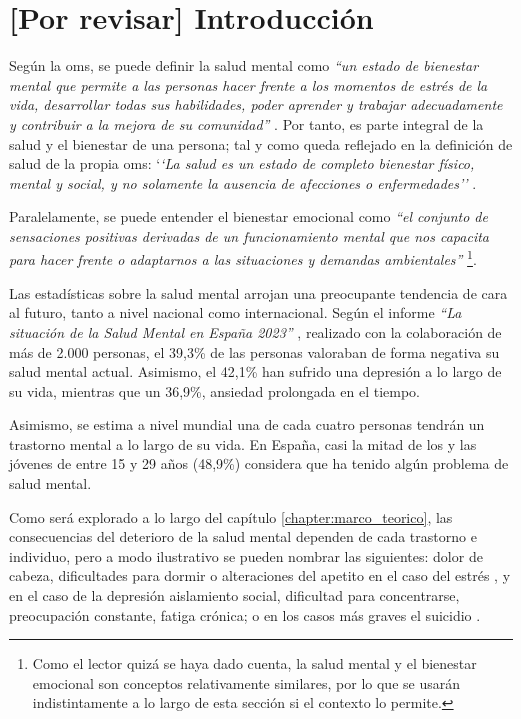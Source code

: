 \chapter{[Por revisar] Introducción}
\label{chapter:introduccion}


Según la \gls{oms}, se puede definir la salud mental como \textit{``un estado de bienestar mental que permite a las personas hacer frente a los momentos de estrés de la vida, desarrollar todas sus habilidades, poder aprender y trabajar adecuadamente y contribuir a la mejora de su comunidad''} \cite{oms_salud_2022}. Por tanto, es parte integral de la salud y el bienestar de una persona; tal y como queda reflejado en la definición de salud de la propia \gls{oms}: `\textit{`La salud es un estado de completo bienestar físico, mental y social, y no solamente la ausencia de afecciones o enfermedades''} \cite{feafes_galicia_que_nodate}.

Paralelamente, se puede entender el bienestar emocional como \textit{``el conjunto de sensaciones positivas derivadas de un funcionamiento mental que nos capacita para hacer frente o adaptarnos a las situaciones y demandas ambientales''} \cite{morer_linan_que_2019}  \footnote{Como el lector quizá se haya dado cuenta, la salud mental y el bienestar emocional son conceptos relativamente similares, por lo que se usarán indistintamente a lo largo de esta sección si el contexto lo permite.}.

Las estadísticas sobre la salud mental arrojan una preocupante tendencia de cara al futuro, tanto a nivel nacional como internacional. Según el informe \textit{``La situación de la Salud Mental en España 2023''} \cite{confederacion_salud_mental_espana_cuatro_2023}, realizado con la colaboración de más de 2.000 personas, el 39,3\% de las personas valoraban de forma negativa su salud mental actual. Asimismo, el 42,1\% han sufrido una depresión a lo largo de su vida, mientras que un 36,9\%, ansiedad prolongada en el tiempo. 

Asimismo, se estima a nivel mundial una de cada cuatro personas tendrán un trastorno mental a lo largo de su vida. En España, casi la mitad de los y las jóvenes de entre 15 y 29 años (48,9\%) considera que ha tenido algún problema de salud mental.

Como será explorado a lo largo del capítulo \ref{chapter:marco_teorico}, las consecuencias del deterioro de la salud mental dependen de cada trastorno e individuo, pero a modo ilustrativo se pueden nombrar las siguientes: dolor de cabeza, dificultades para dormir o alteraciones del apetito en el caso del estrés \cite{oms_estres_2023}, y en el caso de la depresión aislamiento social, dificultad para concentrarse, preocupación constante, fatiga crónica; o en los casos más graves el suicidio \cite{mayo_clinic_depresion_2022}.

